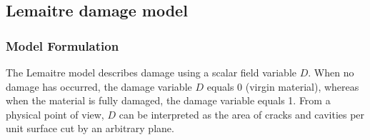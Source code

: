\documentclass[sn-mathphys,Numbered,draft]{sn-jnl}%
\begin{document}
%

\subsection{Lemaitre damage model}

\subsubsection{Model Formulation}

The Lemaitre model describes damage using a scalar field variable $D$.
When no damage has occurred, the damage variable $D$ equals 0 (virgin material), whereas when the material is fully damaged, the damage variable equals 1.
From a physical point of view, $D$ can be interpreted as the area of cracks and cavities per unit surface cut by an arbitrary plane.

%
\end{document}
